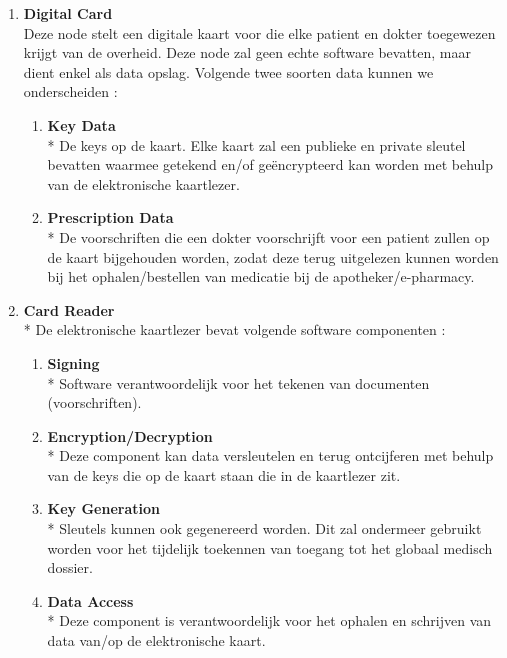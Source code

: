 \documentclass[a4paper,10pt]{article}
\begin{document}
\begin{enumerate}
 \item \textbf{Digital Card}\\
Deze node stelt een digitale kaart voor die elke patient en dokter toegewezen krijgt van de overheid. Deze node zal geen echte software bevatten, maar dient enkel als data opslag. Volgende twee soorten data kunnen we onderscheiden :
\begin{enumerate}
 \item \textbf{Key Data}\\*
De keys op de kaart. Elke kaart zal een publieke en private sleutel bevatten waarmee getekend en/of geëncrypteerd kan worden met behulp van de elektronische kaartlezer.
\item \textbf{Prescription Data}\\*
De voorschriften die een dokter voorschrijft voor een patient zullen op de kaart bijgehouden worden, zodat deze terug uitgelezen kunnen worden bij het ophalen/bestellen van medicatie bij de apotheker/e-pharmacy.
\end{enumerate}

\item \textbf{Card Reader}\\*
De elektronische kaartlezer bevat volgende software componenten : 
\begin{enumerate}
\item \textbf{Signing}\\*
Software verantwoordelijk voor het tekenen van documenten (voorschriften).
\item \textbf{Encryption/Decryption}\\*
Deze component kan data versleutelen en terug ontcijferen met behulp van de keys die op de kaart staan die in de kaartlezer zit.
\item \textbf{Key Generation}\\*
Sleutels kunnen ook gegenereerd worden. Dit zal ondermeer gebruikt worden voor het tijdelijk toekennen van toegang tot het globaal medisch dossier.
\item \textbf{Data Access}\\*
Deze component is verantwoordelijk voor het ophalen en schrijven van data van/op de elektronische kaart.
\end{enumerate}


\end{enumerate}
\end{document}

